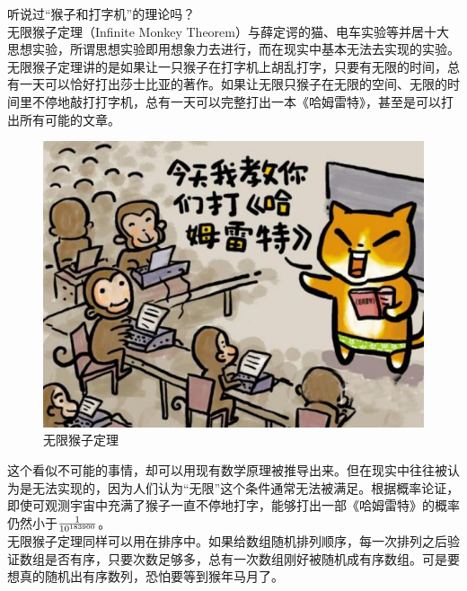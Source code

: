 听说过“猴子和打字机”的理论吗？ \\

无限猴子定理（Infinite Monkey Theorem）与薛定谔的猫、电车实验等并居十大思想实验，所谓思想实验即用想象力去进行，而在现实中基本无法去实现的实验。 \\

无限猴子定理讲的是如果让一只猴子在打字机上胡乱打字，只要有无限的时间，总有一天可以恰好打出莎士比亚的著作。如果让无限只猴子在无限的空间、无限的时间里不停地敲打打字机，总有一天可以完整打出一本《哈姆雷特》，甚至是可以打出所有可能的文章。

\begin{figure}[H]
    \centering
    \includegraphics[]{img/C8/8-12/1.png}
    \caption{无限猴子定理}
\end{figure}

这个看似不可能的事情，却可以用现有数学原理被推导出来。但在现实中往往被认为是无法实现的，因为人们认为“无限”这个条件通常无法被满足。根据概率论证，即使可观测宇宙中充满了猴子一直不停地打字，能够打出一部《哈姆雷特》的概率仍然小于$ 1 \over 10^{183900} $。 \\

无限猴子定理同样可以用在排序中。如果给数组随机排列顺序，每一次排列之后验证数组是否有序，只要次数足够多，总有一次数组刚好被随机成有序数组。可是要想真的随机出有序数列，恐怕要等到猴年马月了。

\newpage